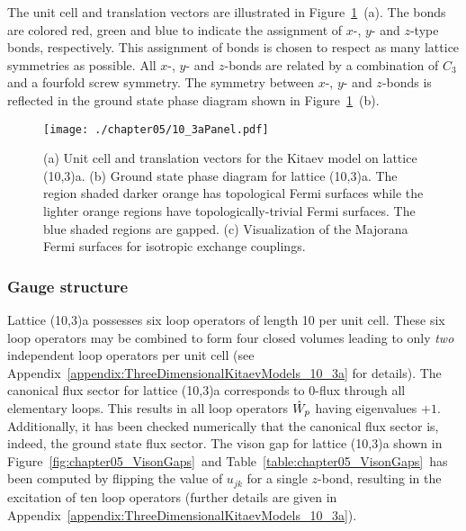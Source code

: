 The unit cell and translation vectors are illustrated in Figure~\ref{fig:chapter05_10_3aPanel}~(a).
The bonds are colored red, green and blue to indicate the assignment of $x$-, $y$- and $z$-type bonds, respectively.
This assignment of bonds is chosen to respect as many lattice symmetries as possible.
All $x$-, $y$- and $z$-bonds are related by a combination of $C_3$ and a fourfold screw symmetry.
The symmetry between $x$-, $y$- and $z$-bonds is reflected in the ground state phase diagram shown in Figure~\ref{fig:chapter05_10_3aPanel}~(b).
%
\begin{figure}[tb]
	\centering
	\texttt{[image: ./chapter05/10\_3aPanel.pdf]}
	\caption{
		(a) Unit cell and translation vectors for the Kitaev model on lattice (10,3)a.
		(b) Ground state phase diagram for lattice (10,3)a.
		The region shaded darker orange has topological Fermi surfaces while the lighter orange regions have topologically-trivial Fermi surfaces.
		The blue shaded regions are gapped.
		(c) Visualization of the Majorana Fermi surfaces for isotropic exchange couplings.
	}
	\label{fig:chapter05_10_3aPanel}
\end{figure}
%


%
%
\subsubsection{Gauge structure}
%
%
Lattice (10,3)a possesses six loop operators of length 10 per unit cell.
These six loop operators may be combined to form four closed volumes leading to only \textit{two} independent loop operators per unit cell (see Appendix~\ref{appendix:ThreeDimensionalKitaevModels_10_3a} for details).
The canonical flux sector for lattice (10,3)a corresponds to $0$-flux through all elementary loops.
This results in all loop operators $\hat{W}_p$ having eigenvalues $+1$.
Additionally, it has been checked numerically that the canonical flux sector is, indeed, the ground state flux sector.
The vison gap for lattice (10,3)a shown in Figure~\ref{fig:chapter05_VisonGaps}~and Table~\ref{table:chapter05_VisonGaps}~has been computed by flipping the value of $u_{jk}$ for a single $z$-bond, resulting in the excitation of ten loop operators (further details are given in Appendix~\ref{appendix:ThreeDimensionalKitaevModels_10_3a}).


%
%
